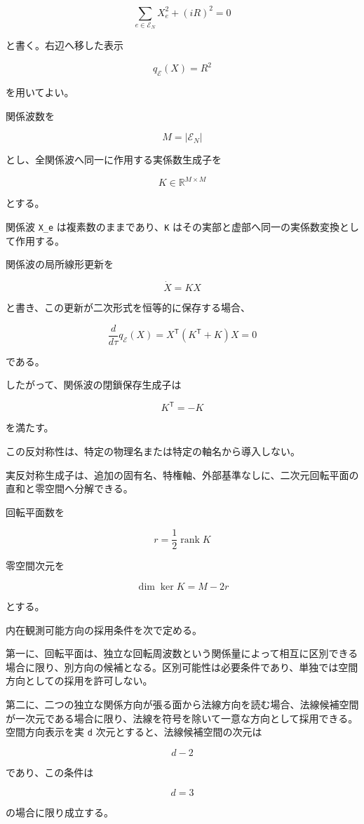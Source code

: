 \documentclass[
  a4paper,
]{ltjsarticle}
\begin{document}
\[
\sum_{e\in\mathcal E_N}X_e^2+(iR)^2=0
\]

と書く。右辺へ移した表示

\[
q_{\mathcal E}(X)=R^2
\]

を用いてよい。

関係波数を

\[
M=\left|\mathcal E_N\right|
\]

とし、全関係波へ同一に作用する実係数生成子を

\[
K\in\mathbb R^{M\times M}
\]

とする。

関係波 \texttt{X\_e} は複素数のままであり、\texttt{K}
はその実部と虚部へ同一の実係数変換として作用する。

関係波の局所線形更新を

\[
\dot X=KX
\]

と書き、この更新が二次形式を恒等的に保存する場合、

\[
\frac{d}{d\tau}q_{\mathcal E}(X)
=X^{\mathsf T}\left(K^{\mathsf T}+K\right)X
=0
\]

である。

したがって、関係波の閉鎖保存生成子は

\[
K^{\mathsf T}=-K
\]

を満たす。

この反対称性は、特定の物理名または特定の軸名から導入しない。

実反対称生成子は、追加の固有名、特権軸、外部基準なしに、二次元回転平面の直和と零空間へ分解できる。

回転平面数を

\[
r=\frac12\operatorname{rank}K
\]

零空間次元を

\[
\dim\ker K=M-2r
\]

とする。

内在観測可能方向の採用条件を次で定める。

第一に、回転平面は、独立な回転周波数という関係量によって相互に区別できる場合に限り、別方向の候補となる。区別可能性は必要条件であり、単独では空間方向としての採用を許可しない。

第二に、二つの独立な関係方向が張る面から法線方向を読む場合、法線候補空間が一次元である場合に限り、法線を符号を除いて一意な方向として採用できる。空間方向表示を実
\texttt{d} 次元とすると、法線候補空間の次元は

\[
d-2
\]

であり、この条件は

\[
d=3
\]

の場合に限り成立する。
\end{document}
